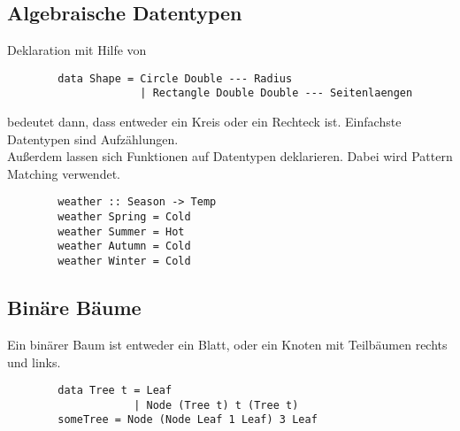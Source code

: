 \subsection{Algebraische Datentypen}%
\label{hsk:sub:algebraische-datentypen}
Deklaration mit Hilfe von 
\begin{lstlisting}
        data Shape = Circle Double --- Radius
                     | Rectangle Double Double --- Seitenlaengen
\end{lstlisting}
 bedeutet dann, dass  entweder ein Kreis oder ein Rechteck ist.
Einfachste Datentypen sind Aufzählungen.\\
Außerdem lassen sich Funktionen auf Datentypen deklarieren. Dabei wird Pattern Matching verwendet.
\begin{lstlisting}
        weather :: Season -> Temp
        weather Spring = Cold
        weather Summer = Hot
        weather Autumn = Cold
        weather Winter = Cold
\end{lstlisting}

\subsection{Binäre Bäume}%
\label{hsk:sub:binaere-baeume}
Ein binärer Baum ist entweder ein Blatt, oder ein Knoten mit Teilbäumen rechts und links.
\begin{lstlisting}
        data Tree t = Leaf
                    | Node (Tree t) t (Tree t)
        someTree = Node (Node Leaf 1 Leaf) 3 Leaf 
\end{lstlisting}

